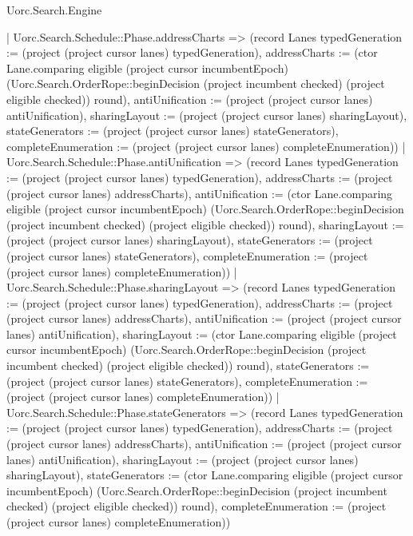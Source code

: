 \begin{lexlean}{Uorc.Search.Engine}
\begin{semanticmodule}
{{        | Uorc.Search.Schedule::Phase.addressCharts => (record Lanes {typedGeneration := (project (project cursor lanes) typedGeneration), addressCharts := (ctor Lane.comparing eligible (project cursor incumbentEpoch) (Uorc.Search.OrderRope::beginDecision (project incumbent checked) (project eligible checked)) round), antiUnification := (project (project cursor lanes) antiUnification), sharingLayout := (project (project cursor lanes) sharingLayout), stateGenerators := (project (project cursor lanes) stateGenerators), completeEnumeration := (project (project cursor lanes) completeEnumeration)})
        | Uorc.Search.Schedule::Phase.antiUnification => (record Lanes {typedGeneration := (project (project cursor lanes) typedGeneration), addressCharts := (project (project cursor lanes) addressCharts), antiUnification := (ctor Lane.comparing eligible (project cursor incumbentEpoch) (Uorc.Search.OrderRope::beginDecision (project incumbent checked) (project eligible checked)) round), sharingLayout := (project (project cursor lanes) sharingLayout), stateGenerators := (project (project cursor lanes) stateGenerators), completeEnumeration := (project (project cursor lanes) completeEnumeration)})
        | Uorc.Search.Schedule::Phase.sharingLayout => (record Lanes {typedGeneration := (project (project cursor lanes) typedGeneration), addressCharts := (project (project cursor lanes) addressCharts), antiUnification := (project (project cursor lanes) antiUnification), sharingLayout := (ctor Lane.comparing eligible (project cursor incumbentEpoch) (Uorc.Search.OrderRope::beginDecision (project incumbent checked) (project eligible checked)) round), stateGenerators := (project (project cursor lanes) stateGenerators), completeEnumeration := (project (project cursor lanes) completeEnumeration)})
        | Uorc.Search.Schedule::Phase.stateGenerators => (record Lanes {typedGeneration := (project (project cursor lanes) typedGeneration), addressCharts := (project (project cursor lanes) addressCharts), antiUnification := (project (project cursor lanes) antiUnification), sharingLayout := (project (project cursor lanes) sharingLayout), stateGenerators := (ctor Lane.comparing eligible (project cursor incumbentEpoch) (Uorc.Search.OrderRope::beginDecision (project incumbent checked) (project eligible checked)) round), completeEnumeration := (project (project cursor lanes) completeEnumeration)})
}}
\end{semanticmodule}
\end{lexlean}
